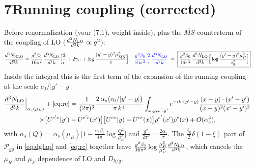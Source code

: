 \documentclass[10pt]{article}
\numberwithin{equation}{section}
\newcommand{\new}[1]{{\color{blue}#1}}
\newcommand{\MSb}{\overline{MS}}
\begin{document}
\section*{7\quad Running coupling (corrected)}
Before renormalization (your (7.1), weight inside), plus the $\MSb$ counterterm of the coupling of LO ($\frac{d^3N_{\rm LO}}{d^3k}\propto g^2$):
\begin{equation}
\frac{d^{3}N_{\rm NLO}}{d^{3}k}=\frac{g^{2}\beta_{0}}{16\pi^{2}}\,\frac{d^{3}N_{\rm LO}}{d^{3}k}\Big[\frac{2}{\epsilon}+2\gamma_{E}+\log\frac{(y'-y)^{2}\mu^{2}_{\MSb}}{4}\Big]\;\new{-\frac{g^{2}\beta_{0}}{16\pi^{2}}\,\frac2\epsilon\,\frac{d^{3}N_{\rm LO}}{d^{3}k}}\;=\;\boxed{\frac{g^{2}\beta_{0}}{16\pi^{2}}\,\frac{d^{3}N_{\rm LO}}{d^{3}k}\Big[\log\frac{(y'-y)^{2}\mu^{2}_{R}}{c_0^2}\Big]}\label{eq:rc}
\end{equation}
Inside the integral this is the first term of the expansion of the running coupling at the scale $c_0/|y'-y|$:
\begin{multline}
\frac{d^3N_{\rm LO}}{d^3k}\Big|_{\alpha_s(\mu_R)}+\eqref{eq:rc}=\frac{1}{(2\pi)^{3}}\frac{2\,\alpha_s\big(c_0/|y'-y|\big)}{\pi\,k^{+}}\int_{x,y,x',y'}e^{-ik\cdot(y'-y)}\frac{(x-y)\cdot(x'-y')}{(x-y)^{2}(x'-y')^{2}}\\\times\big[U^{e'c}(y')-U^{e'c}(x')\big]\big[U^{ec}(y)-U^{ce}(x)\big]\rho^{e'}(x')\rho^{e}(x)+O(\alpha_s^3),
\end{multline}
with $\alpha_s(Q)=\alpha_s(\mu_R)\big[1-\frac{\alpha_s\beta_0}{4\pi}\log\frac{Q^2}{\mu_R^2}\big]$ and $\frac{g^2}{2\pi^2}=\frac{2\alpha_s}{\pi}$. The $\frac{\beta_0}{2}\delta(1-\xi)$ part of $\mathcal P_{gg}$ in \eqref{eq:dglap} and \eqref{eq:rc} together leave $\frac{g^2\beta_0}{16\pi^2}\log\frac{\mu_R^2}{\mu_F^2}\frac{d^3N_{\rm LO}}{d^3k}$, which cancels the $\mu_R$ and $\mu_F$ dependence of LO and $D_{h/g}$.
\end{document}
